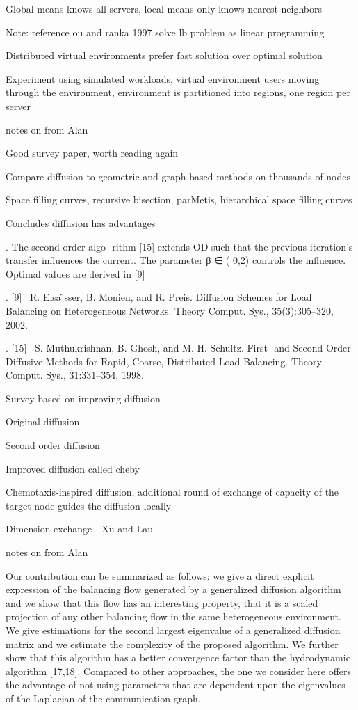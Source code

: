 \documentclass{article}
\begin{document}
Global means knows all servers, local means only knows nearest neighbors

Note: reference ou and ranka 1997 solve lb problem as linear programming

Distributed virtual environments prefer fast solution over optimal solution

Experiment using simulated workloads, virtual environment users moving through the environment, environment is partitioned into regions, one region per server


\medskip

notes on
\cite{Lieber:2016:PDL:2966884.2966887}
from Alan


Good survey paper, worth reading again

Compare diffusion to geometric and graph based methods on thousands of nodes

Space filling curves, recursive bisection, parMetis, hierarchical space filling curves

Concludes diffusion has advantages

	.	The second-order algo- rithm [15] extends OD such that the previous iteration’s transfer influences the current. The parameter β ∈ ( 0,2) controls the influence. Optimal values are derived in [9] 

	.	[9]  R. Elsa ̈sser, B. Monien, and R. Preis. Diffusion Schemes for Load Balancing on Heterogeneous Networks. Theory Comput. Sys., 35(3):305–320, 2002. 

	.	[15]  S. Muthukrishnan, B. Ghosh, and M. H. Schultz. First  and Second Order Diffusive Methods for Rapid, Coarse, Distributed Load Balancing. Theory Comput. Sys., 31:331–354, 1998. 

Survey based on improving diffusion

Original diffusion

Second order diffusion

Improved diffusion called cheby

Chemotaxis-inspired diffusion, additional round of exchange of capacity of the target node guides the diffusion locally

Dimension exchange - Xu and Lau



\medskip

notes on
\cite{ROTARU2004481}
from Alan


Our contribution  can be summarized as follows: we give a direct explicit expression of the balancing flow generated by a generalized diffusion algorithm and we show that this flow has an interesting property, that it is a scaled projection of any other balancing flow in the same heterogeneous environment. We give estimations for the second largest eigenvalue of a generalized diffusion matrix and we estimate the complexity of the proposed algorithm.  We further show that this algorithm has a better convergence factor than the hydrodynamic algorithm [17,18]. Compared to other approaches, the one we consider here offers the advantage of not using parameters that are dependent upon the eigenvalues of the Laplacian of the communication graph. 
\end{document}

